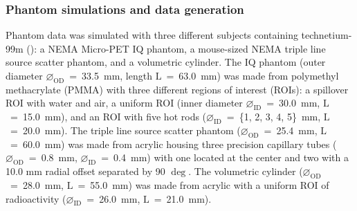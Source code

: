 \documentclass[utf8]{FrontiersinVancouver}
\begin{document}




\subsubsection{Phantom simulations and data generation}

Phantom data was simulated with three different subjects containing technetium-99m (): a NEMA Micro-PET IQ phantom, a mouse-sized NEMA triple line source scatter phantom, and a volumetric cylinder. The IQ phantom (outer diameter $\diameter_{\mathrm{OD}}$~=~33.5~mm, length $\mathrm{L}$~=~63.0~mm) was made from polymethyl methacrylate (PMMA) with three different regions of interest (ROIs): a spillover ROI with water and air, a uniform ROI (inner diameter $\diameter_{\mathrm{ID}}$~=~30.0~mm, $\mathrm{L}$~=~15.0~mm), and an ROI with five hot rods ($\diameter_{\mathrm{ID}}$~=~\{1, 2, 3, 4, 5\}~mm, $\mathrm{L}$~=~20.0~mm). The triple line source scatter phantom ($\diameter_{\mathrm{OD}}$~=~25.4~mm, $\mathrm{L}$~=~60.0~mm) was made from acrylic housing three precision capillary tubes ($\diameter_{\mathrm{OD}}$~=~0.8~mm, $\diameter_{\mathrm{ID}}$~=~0.4~mm) with one located at the center and two with a 10.0 mm radial offset separated by 90 $\deg$. The volumetric cylinder ($\diameter_{\mathrm{OD}}$~=~28.0~mm, $\mathrm{L}$~=~55.0~mm) was made from acrylic with a uniform ROI of radioactivity ($\diameter_{\mathrm{ID}}$~=~26.0~mm, $\mathrm{L}$~=~21.0~mm). 
\end{document}
